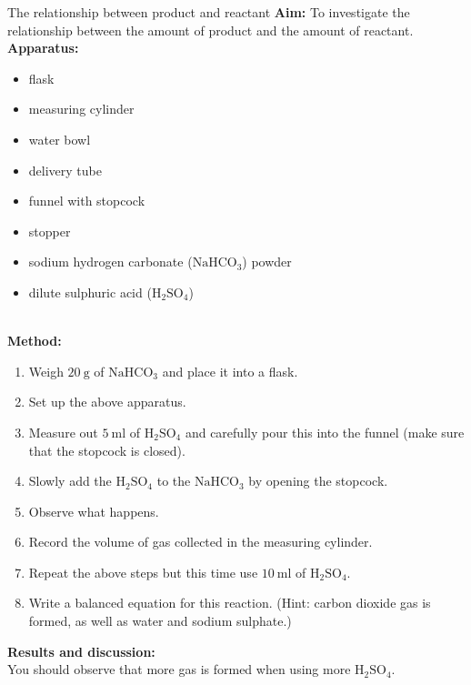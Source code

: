 \begin{g_experiment}{The relationship between product and reactant}
\textbf{Aim:} To investigate the relationship between the amount of product and the amount of reactant.\\
\textbf{Apparatus:}\\
\begin{minipage}{.5\textwidth}
 \begin{itemize}[noitemsep]
  \item flask
\item measuring cylinder
\item water bowl
\item delivery tube
\item funnel with stopcock
\item stopper
\item sodium hydrogen carbonate ($\text{NaHCO}_{3}$) powder
\item dilute sulphuric acid ($\text{H}_{2}\text{SO}_{4}$)
 \end{itemize}
\end{minipage}
\begin{minipage}{.5\textwidth}
\begin{center}
\end{center}
\end{minipage} \\
\textbf{Method:} 
\begin{enumerate}[noitemsep,label=\textbf{\arabic*}]
 \item Weigh $20~\text{g}$ of $\text{NaHCO}_{3}$ and place it into a flask.
\item Set up the above apparatus.
\item Measure out $5~\text{ml}$ of $\text{H}_{2}\text{SO}_{4}$ and carefully pour this into the funnel (make sure that the stopcock is closed).
\item Slowly add the $\text{H}_{2}\text{SO}_{4}$ to the $\text{NaHCO}_{3}$ by opening the stopcock.
\item Observe what happens.
\item Record the volume of gas collected in the measuring cylinder.
\item Repeat the above steps but this time use $10~\text{ml}$ of $\text{H}_{2}\text{SO}_{4}$.
\item Write a balanced equation for this reaction. (Hint: carbon dioxide gas is formed, as well as water and sodium sulphate.)
\end{enumerate}
\textbf{Results and discussion:}\\
You should observe that more gas is formed when using more $\text{H}_{2}\text{SO}_{4}$. 
\end{g_experiment}

